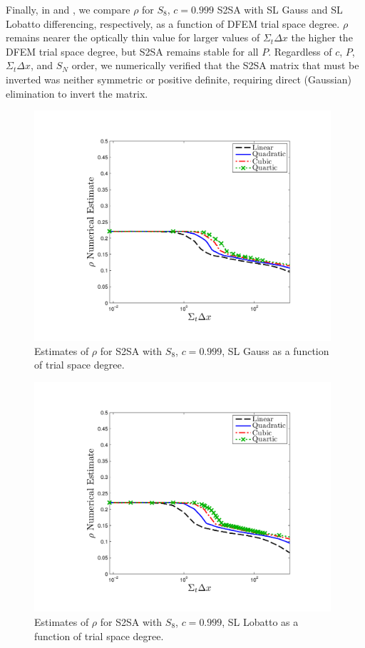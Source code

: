 Finally, in  and , we compare $\rho$ for $S_8$, $c=0.999$ S2SA with SL Gauss and SL Lobatto differencing, respectively, as a function of DFEM trial space degree.
$\rho$ remains nearer the optically thin value for larger values of $\Sigma_t \Delta x$ the higher the DFEM trial space degree, but S2SA remains stable for all $P$. 
Regardless of $c$, $P$, $\Sigma_t \Delta x$, and $S_N$ order, we numerically verified that the S2SA matrix that must be inverted was neither symmetric or positive definite, requiring direct (Gaussian) elimination to invert the matrix.
%
%
\begin{figure}[!hbp]
\centering
\includegraphics[width=11cm]{chapter4_acceleration/Constant_XS_SN8_S2SA_Gauss.pdf}
\caption{Estimates of $\rho$ for S2SA with $S_8$, $c=0.999$, SL Gauss as a function of trial space degree.}
\label{fig:s2sa_gauss}
\end{figure}
%
%
\begin{figure}[!htp]
\centering
\includegraphics[width=11cm]{chapter4_acceleration/Constant_XS_SN8_S2SA_Lobatto.pdf}
\caption{Estimates of $\rho$ for S2SA with $S_8$, $c=0.999$, SL Lobatto as a function of trial space degree.}
\label{fig:s2sa_lobatto}
\end{figure}

